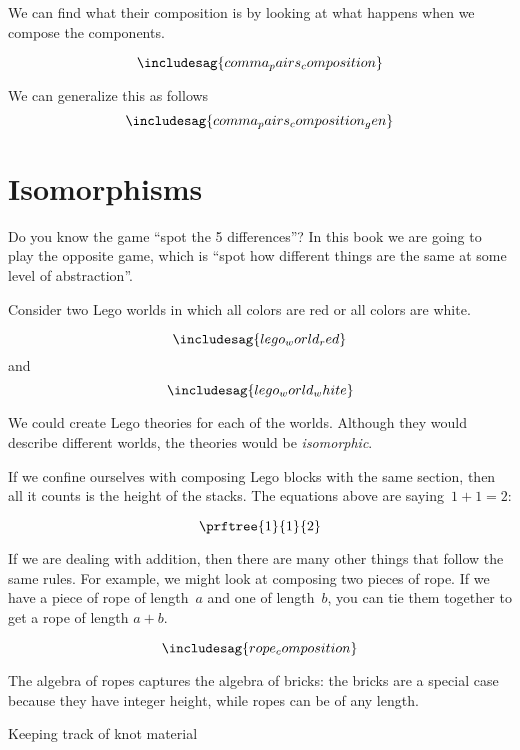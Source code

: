 %
We can find what their composition is by looking at what happens when we compose the components.

\begin{equation*}
\includesag{comma_pairs_composition}
\end{equation*}

We can generalize this as follows
\begin{equation*}
\includesag{comma_pairs_composition_gen}
\end{equation*}

\section{Isomorphisms}


Do you know the game ``spot the 5 differences''? In this book we are going to play the opposite game, which is ``spot how different things are the same at some level of abstraction''.

Consider two Lego worlds in which all colors are red or all colors are white.

\begin{equation}
\includesag{lego_world_red}
\end{equation}
and
\begin{equation}
\includesag{lego_world_white}
\end{equation}

We could create Lego theories for each of the worlds. Although they would describe different worlds, the theories would be \emph{isomorphic}.

If we confine ourselves with composing Lego blocks with the same section, then all it counts is the height of the stacks.
The equations above are saying~$1+1=2$:

\begin{equation}
  \prftree{1}{1}{2}
\end{equation}

If we are dealing with addition, then there are many other things that follow the same rules.
For example, we might look at composing two pieces of rope. If we have a piece of rope of length~$a$ and one of length~$b$, you can tie them together to get a rope of length $a+b$.

\begin{equation*}\label{eq:rope-compose}
\includesag{rope_composition}
\end{equation*}

The algebra of ropes captures the algebra of bricks: the bricks are a special case because they have integer height, while ropes can be of any length.
\begin{marginfigure}
  \caption{Keeping track of knot material}\label{fig:knot}
\end{marginfigure}


